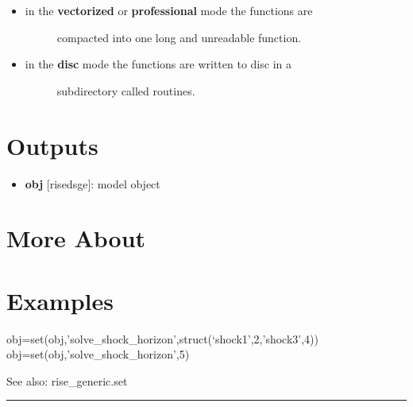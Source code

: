 \documentclass[letterpaper,10pt,english]{sphinxmanual}
\begin{document}
\begin{itemize}
\begin{itemize}
\begin{description}
\begin{itemize}
\begin{description}
\end{description}

\item {} \begin{description}
\item[{in the \textbf{vectorized} or \textbf{professional} mode the functions are}] \leavevmode
compacted into one long and unreadable function.

\end{description}

\item {} \begin{description}
\item[{in the \textbf{disc} mode the functions are written to disc in a}] \leavevmode
subdirectory called routines.

\end{description}

\end{itemize}

\end{description}

\end{itemize}

\end{itemize}


\section{Outputs}
\label{classes/models/@dsge/dsge:id152}\begin{itemize}
\item {} 
\textbf{obj} {[}rise\textbar{}dsge{]}: model object

\end{itemize}


\section{More About}
\label{classes/models/@dsge/dsge:id153}

\section{Examples}
\label{classes/models/@dsge/dsge:id154}
obj=set(obj,'solve\_shock\_horizon',struct(`shock1',2,'shock3',4))
obj=set(obj,'solve\_shock\_horizon',5)

See also: rise\_generic.set


\bigskip\hrule{}\bigskip
\end{document}

